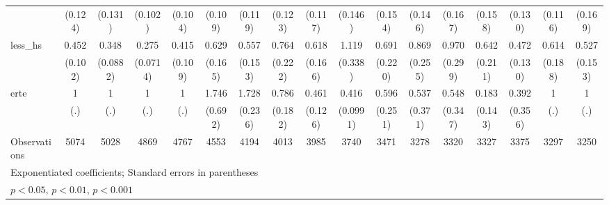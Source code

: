 {\begin{tabular}{l*{16}{c}}
                    &     (0.124)         &     (0.131)         &     (0.102)         &     (0.104)         &     (0.109)         &     (0.119)         &     (0.123)         &     (0.117)         &     (0.146)         &     (0.154)         &     (0.146)         &     (0.167)         &     (0.158)         &     (0.130)         &     (0.116)         &     (0.169)         \\
[1em]
less\_hs             &       0.452\sym{***}&       0.348\sym{***}&       0.275\sym{***}&       0.415\sym{***}&       0.629         &       0.557\sym{*}  &       0.764         &       0.618         &       1.119         &       0.691         &       0.869         &       0.970         &       0.642         &       0.472\sym{**} &       0.614         &       0.527\sym{*}  \\
                    &     (0.102)         &    (0.0882)         &    (0.0714)         &     (0.109)         &     (0.165)         &     (0.153)         &     (0.222)         &     (0.166)         &     (0.338)         &     (0.220)         &     (0.255)         &     (0.299)         &     (0.211)         &     (0.130)         &     (0.188)         &     (0.153)         \\
[1em]
erte                &           1         &           1         &           1         &           1         &       1.746         &       1.728\sym{***}&       0.786         &       0.461\sym{**} &       0.416\sym{***}&       0.596         &       0.537         &       0.548         &       0.183\sym{*}  &       0.392         &           1         &           1         \\
                    &         (.)         &         (.)         &         (.)         &         (.)         &     (0.692)         &     (0.236)         &     (0.182)         &     (0.126)         &    (0.0991)         &     (0.251)         &     (0.371)         &     (0.347)         &     (0.143)         &     (0.356)         &         (.)         &         (.)         \\
\hline
Observations        &        5074         &        5028         &        4869         &        4767         &        4553         &        4194         &        4013         &        3985         &        3740         &        3471         &        3278         &        3320         &        3327         &        3375         &        3297         &        3250         \\
\hline\hline
\multicolumn{17}{l}{\footnotesize Exponentiated coefficients; Standard errors in parentheses}\\
\multicolumn{17}{l}{\footnotesize \sym{*} \(p<0.05\), \sym{**} \(p<0.01\), \sym{***} \(p<0.001\)}\\
\end{tabular}
}
